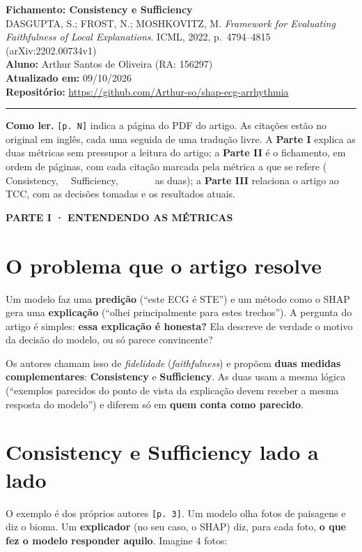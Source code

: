 \documentclass[11pt,a4paper]{article}
\newcommand{\metrictag}[2]{{\setlength{\fboxsep}{1.5pt}%
  \ifstrequal{#1}{c}{\colorbox{cC}{\textcolor{white}{\scriptsize\textbf{#2}}}}{%
  \ifstrequal{#1}{s}{\colorbox{cS}{\textcolor{white}{\scriptsize\textbf{#2}}}}{%
  \colorbox{black!60}{\textcolor{white}{\scriptsize\textbf{#2}}}}}}}
\newcommand{\partbar}[1]{\par\vspace{1.2em}\noindent\colorbox{black!80}{\parbox{\dimexpr\linewidth-2\fboxsep}{\color{white}\bfseries\sffamily\MakeUppercase{#1}}}\par\vspace{0.4em}}
\begin{document}
\begin{center}
    {\LARGE \textbf{Fichamento: Consistency e Sufficiency}} \\[0.35em]
    {\large DASGUPTA, S.; FROST, N.; MOSHKOVITZ, M. \textit{Framework for Evaluating Faithfulness of Local Explanations}. ICML, 2022, p.~4794--4815 (arXiv:2202.00734v1)} \\[0.3em]
    \textbf{Aluno:} Arthur Santos de Oliveira (RA: 156297) \\[0.2em]
    \textbf{Atualizado em:} 09/10/2026 \\[0.2em]
    \textbf{Repositório:} \url{https://github.com/Arthur-so/shap-ecg-arrhythmia}
\end{center}
\vspace{-0.5em}
\hrule
\vspace{0.8em}

\textbf{Como ler.} \texttt{[p. N]} indica a página do PDF do artigo. As citações estão no original em inglês, cada uma seguida de uma tradução livre. A \textbf{Parte I} explica as duas métricas sem pressupor a leitura do artigo; a \textbf{Parte II} é o fichamento, em ordem de páginas, com cada citação marcada pela métrica a que se refere (\metrictag{c}{C} Consistency, \metrictag{s}{S} Sufficiency, \metrictag{cs}{C + S} as duas); a \textbf{Parte III} relaciona o artigo ao TCC, com as decisões tomadas e os resultados atuais.


\partbar{Parte I · Entendendo as métricas}

\section{O problema que o artigo resolve}
Um modelo faz uma \textbf{predição} (“este ECG é STE”) e um método como o SHAP gera uma \textbf{explicação} (“olhei principalmente para estes trechos”). A pergunta do artigo é simples: \textbf{essa explicação é honesta?} Ela descreve de verdade o motivo da decisão do modelo, ou só parece convincente?

Os autores chamam isso de \textit{fidelidade} (\textit{faithfulness}) e propõem \textbf{duas medidas complementares}: \textbf{Consistency} e \textbf{Sufficiency}. As duas usam a mesma lógica (“exemplos parecidos do ponto de vista da explicação devem receber a mesma resposta do modelo”) e diferem só em \textbf{quem conta como parecido}.

\section{Consistency e Sufficiency lado a lado}
O exemplo é dos próprios autores \texttt{[p. 3]}. Um modelo olha fotos de paisagens e diz o bioma. Um \textbf{explicador} (no seu caso, o SHAP) diz, para cada foto, \textbf{o que fez o modelo responder aquilo}. Imagine 4 fotos:
\end{document}
